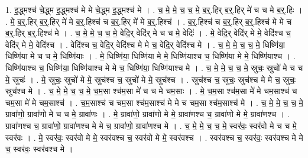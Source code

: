 \documentclass[17pt]{extarticle}
\begin{document}
1. इ॒द्ध्मश्च॑ चे॒द्ध्म इ॒द्ध्मश्च॑ मे मे चे॒द्ध्म इ॒द्ध्मश्च॑ मे । . च॒ मे॒ मे॒ च॒ च॒ मे॒ ब॒र्॒.हिर् ब॒र्॒.हिर् मे॑ च च मे ब॒र्॒.हिः । . मे॒ ब॒र्॒.हिर् ब॒र्॒.हिर् मे॑ मे ब॒र्॒.हिश्च॑ च ब॒र्॒.हिर् मे॑ मे ब॒र्॒.हिश्च॑ । . ब॒र्॒.हिश्च॑ च ब॒र्॒.हिर् ब॒र्॒.हिश्च॑ मे मे च ब॒र्॒.हिर् ब॒र्॒.हिश्च॑ मे । . च॒ मे॒ मे॒ च॒ च॒ मे॒ वेदि॒र् वेदि॑र् मे च च मे॒ वेदिः॑ । . मे॒ वेदि॒र् वेदि॑र् मे मे॒ वेदि॑श्च च॒ वेदि॑र् मे मे॒ वेदि॑श्च । . वेदि॑श्च च॒ वेदि॒र् वेदि॑श्च मे मे च॒ वेदि॒र् वेदि॑श्च मे । . च॒ मे॒ मे॒ च॒ च॒ मे॒ धिष्णि॑या॒ धिष्णि॑या मे च च मे॒ धिष्णि॑याः । . मे॒ धिष्णि॑या॒ धिष्णि॑या मे मे॒ धिष्णि॑याश्च च॒ धिष्णि॑या मे मे॒ धिष्णि॑याश्च । . धिष्णि॑याश्च च॒ धिष्णि॑या॒ धिष्णि॑याश्च मे मे च॒ धिष्णि॑या॒ धिष्णि॑याश्च मे । . च॒ मे॒ मे॒ च॒ च॒ मे॒ स्रुचः॒ स्रुचो॑ मे च च मे॒ स्रुचः॑ । . मे॒ स्रुचः॒ स्रुचो॑ मे मे॒ स्रुच॑श्च च॒ स्रुचो॑ मे मे॒ स्रुच॑श्च । . स्रुच॑श्च च॒ स्रुचः॒ स्रुच॑श्च मे मे च॒ स्रुचः॒ स्रुच॑श्च मे । . च॒ मे॒ मे॒ च॒ च॒ मे॒ च॒म॒सा श्च॑म॒सा मे॑ च च मे चम॒साः । . मे॒ च॒म॒सा श्च॑म॒सा मे॑ मे चम॒साश्च॑ च चम॒सा मे॑ मे चम॒साश्च॑ । . च॒म॒साश्च॑ च चम॒सा श्च॑म॒साश्च॑ मे मे च चम॒सा श्च॑म॒साश्च॑ मे । . च॒ मे॒ मे॒ च॒ च॒ मे॒ ग्रावा॑णो॒ ग्रावा॑णो मे च च मे॒ ग्रावा॑णः । . मे॒ ग्रावा॑णो॒ ग्रावा॑णो मे मे॒ ग्रावा॑णश्च च॒ ग्रावा॑णो मे मे॒ ग्रावा॑णश्च । . ग्रावा॑णश्च च॒ ग्रावा॑णो॒ ग्रावा॑णश्च मे मे च॒ ग्रावा॑णो॒ ग्रावा॑णश्च मे । . च॒ मे॒ मे॒ च॒ च॒ मे॒ स्वर॑वः॒ स्वर॑वो मे च च मे॒ स्वर॑वः । . मे॒ स्वर॑वः॒ स्वर॑वो मे मे॒ स्वर॑वश्च च॒ स्वर॑वो मे मे॒ स्वर॑वश्च । . स्वर॑वश्च च॒ स्वर॑वः॒ स्वर॑वश्च मे मे च॒ स्वर॑वः॒ स्वर॑वश्च मे । \newline
\end{document}
